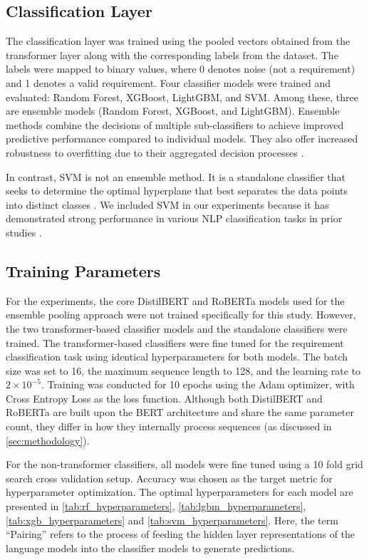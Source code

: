 \documentclass[sigconf,review]{acmart}
\begin{document}
\subsection{Classification Layer}

The classification layer was trained using the pooled vectors obtained from the transformer layer along with the corresponding labels from the dataset. The labels were mapped to binary values, where 0 denotes noise (not a requirement) and 1 denotes a valid requirement. Four classifier models were trained and evaluated: Random Forest, XGBoost, LightGBM, and SVM. Among these, three are ensemble models (Random Forest, XGBoost, and LightGBM). Ensemble methods combine the decisions of multiple sub-classifiers to achieve improved predictive performance compared to individual models. They also offer increased robustness to overfitting due to their aggregated decision processes \cite{breiman2001randomforest}.

In contrast, SVM is not an ensemble method. It is a standalone classifier that seeks to determine the optimal hyperplane that best separates the data points into distinct classes \cite{cortes1995svm}. We included SVM in our experiments because it has demonstrated strong performance in various NLP classification tasks in prior studies \cite{drucker1999svm} \cite{torisawa2007svm} \cite{joachims1998svm}.


\subsection{Training Parameters}

For the experiments, the core DistilBERT and RoBERTa models used for the ensemble pooling approach were not trained specifically for this study. However, the two transformer-based classifier models and the standalone classifiers were trained. The transformer-based classifiers were fine tuned for the requirement classification task using identical hyperparameters for both models. The batch size was set to 16, the maximum sequence length to 128, and the learning rate to $2 \times 10^{-5}$. Training was conducted for 10 epochs using the Adam optimizer, with Cross Entropy Loss as the loss function. Although both DistilBERT and RoBERTa are built upon the BERT architecture and share the same parameter count, they differ in how they internally process sequences (as discussed in \autoref{sec:methodology}).

For the non-transformer classifiers, all models were fine tuned using a 10 fold grid search cross validation setup. Accuracy was chosen as the target metric for hyperparameter optimization. The optimal hyperparameters for each model are presented in  \autoref{tab:rf_hyperparameters}, \autoref{tab:lgbm_hyperparameters}, \autoref{tab:xgb_hyperparameters} and \autoref{tab:svm_hyperparameters}. Here, the term ``Pairing'' refers to the process of feeding the hidden layer representations of the language models into the classifier models to generate predictions.
\end{document}
